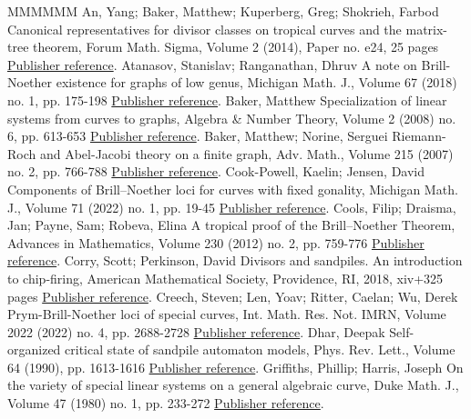 \begin{thebibliography}{MMMMMM}
 An, Yang; Baker, Matthew; Kuperberg, Greg; Shokrieh, Farbod Canonical representatives for divisor classes on tropical curves and the matrix-tree theorem, Forum Math. Sigma, Volume 2 (2014), Paper no. e24, 25 pages \href{https://alco.centre-mersenne.org/articles/10.5802/alco.443/#ABKS}{Publisher reference}.
 Atanasov, Stanislav; Ranganathan, Dhruv A note on Brill-Noether existence for graphs of low genus, Michigan Math. J., Volume 67 (2018) no. 1, pp. 175-198 \href{https://alco.centre-mersenne.org/articles/10.5802/alco.443/#atanasovRanganathan}{Publisher reference}.
 Baker, Matthew Specialization of linear systems from curves to graphs, Algebra \& Number Theory, Volume 2 (2008) no. 6, pp. 613-653 \href{https://alco.centre-mersenne.org/articles/10.5802/alco.443/#BakerSpec}{Publisher reference}.
 Baker, Matthew; Norine, Serguei Riemann-Roch and Abel-Jacobi theory on a finite graph, Adv. Math., Volume 215 (2007) no. 2, pp. 766-788 \href{https://alco.centre-mersenne.org/articles/10.5802/alco.443/#BakNor07}{Publisher reference}.
 Cook-Powell, Kaelin; Jensen, David Components of Brill–Noether loci for curves with fixed gonality, Michigan Math. J., Volume 71 (2022) no. 1, pp. 19-45 \href{https://alco.centre-mersenne.org/articles/10.5802/alco.443/#CookPowellJensen}{Publisher reference}.
 Cools, Filip; Draisma, Jan; Payne, Sam; Robeva, Elina A tropical proof of the Brill–Noether Theorem, Advances in Mathematics, Volume 230 (2012) no. 2, pp. 759-776 \href{https://alco.centre-mersenne.org/articles/10.5802/alco.443/#CDPR12}{Publisher reference}.
 Corry, Scott; Perkinson, David Divisors and sandpiles. An introduction to chip-firing, American Mathematical Society, Providence, RI, 2018, xiv+325 pages \href{https://alco.centre-mersenne.org/articles/10.5802/alco.443/#corry2018divisors}{Publisher reference}.
 Creech, Steven; Len, Yoav; Ritter, Caelan; Wu, Derek Prym-Brill-Noether loci of special curves, Int. Math. Res. Not. IMRN, Volume 2022 (2022) no. 4, pp. 2688-2728 \href{https://alco.centre-mersenne.org/articles/10.5802/alco.443/#CLRW}{Publisher reference}.
 Dhar, Deepak Self-organized critical state of sandpile automaton models, Phys. Rev. Lett., Volume 64 (1990), pp. 1613-1616 \href{https://alco.centre-mersenne.org/articles/10.5802/alco.443/#Dhar90}{Publisher reference}.
 Griffiths, Phillip; Harris, Joseph On the variety of special linear systems on a general algebraic curve, Duke Math. J., Volume 47 (1980) no. 1, pp. 233-272 \href{https://alco.centre-mersenne.org/articles/10.5802/alco.443/#gh80}{Publisher reference}.

\end{thebibliography}

